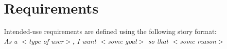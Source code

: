 \newpage
\section{Requirements}
Intended-use requirements are defined using the following story format: \\
\hspace*{1.5cm}\emph{As a $<$type of user$>$, I want $<$some goal$>$ so that $<$some reason$>$}


